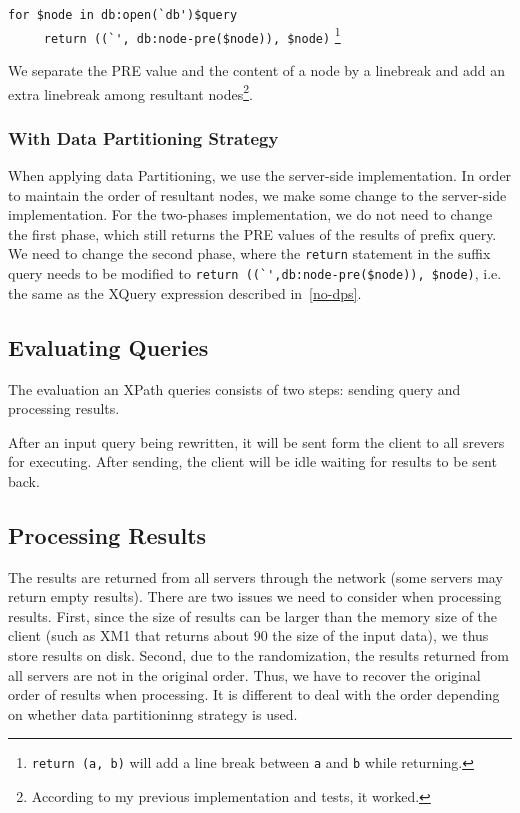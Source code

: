 \verb|for $node in db:open(`db')$query|\\
\verb|     return ((`', db:node-pre($node)), $node)|
\footnote{\texttt{return (a, b)} will add a line break between \texttt{a} and
	\texttt{b} while returning.}

We separate the PRE value and the content of a node by a linebreak and add an
extra linebreak among resultant nodes\footnote{According to my previous
	implementation and tests, it worked.}.


\subsubsection{With Data Partitioning Strategy}

When applying data Partitioning, we use the server-side implementation. In
order to maintain the order of resultant nodes, we make some change to the
server-side implementation. For the two-phases implementation, we do not need to
change the first phase, which still returns the PRE values of the results of
prefix query. We need to change the second phase, where the \verb|return|
statement in the suffix query needs to be modified to 
\verb|return ((`',db:node-pre($node)), $node)|, 
i.e. the same as the XQuery expression described in~\ref{no-dps}.

 

\subsection{Evaluating Queries}

The evaluation an XPath queries consists of two steps: sending query and
processing results. 

After an input query being rewritten, it will be sent form the client to all
srevers for executing. After sending, the client will be idle waiting for
results to be sent back.

\subsection{Processing Results}

The results are returned from all servers through the network (some servers may
return empty results). There are two issues we need to consider when processing
results. First, since the size of results can be larger than the memory size of
the client (such as XM1 that returns about 90 the size of the input data), we
thus store results on disk. Second, due to the randomization, the results
returned from all servers are not in the original order. Thus, we have to
recover the original order of results when processing. It is different to deal
with the order depending on whether data partitioninng strategy is used.

